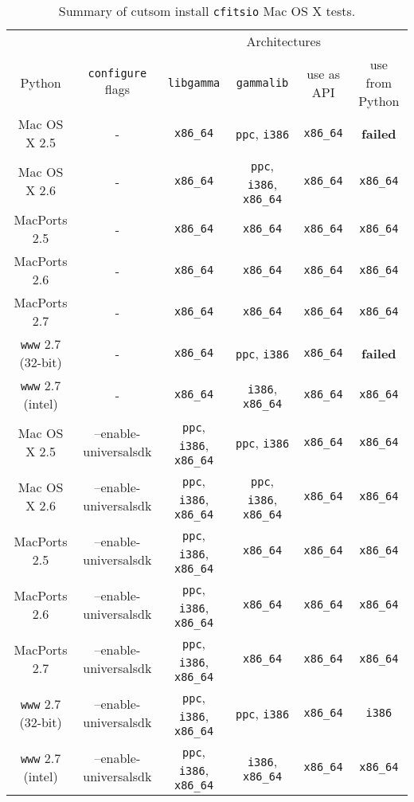 \documentclass{article}[12pt,a4]
\begin{document}
\begin{table}[!h]
  \small
  \center
  \begin{tabular}{cc|cccc}
  \hline
   & & \multicolumn{4}{c}{Architectures} \\
  Python & {\tt configure} flags & {\tt libgamma} & {\tt gammalib} & use as API & use from Python \\
  \hline
  Mac OS X 2.5 & - & {\tt x86\_64} & {\tt ppc}, {\tt i386} & {\tt x86\_64} & {\bf failed} \\
  Mac OS X 2.6 & - & {\tt x86\_64} & {\tt ppc}, {\tt i386}, {\tt x86\_64} & {\tt x86\_64} & {\tt x86\_64} \\
  MacPorts 2.5 & - & {\tt x86\_64} & {\tt x86\_64} & {\tt x86\_64} & {\tt x86\_64} \\
  MacPorts 2.6 & - & {\tt x86\_64} & {\tt x86\_64} & {\tt x86\_64} & {\tt x86\_64} \\
  MacPorts 2.7 & - & {\tt x86\_64} & {\tt x86\_64} & {\tt x86\_64} & {\tt x86\_64} \\
  {\tt www} 2.7 (32-bit) & - & {\tt x86\_64} & {\tt ppc}, {\tt i386} & {\tt x86\_64} &  {\bf failed} \\
  {\tt www} 2.7 (intel) & - & {\tt x86\_64} & {\tt i386}, {\tt x86\_64} & {\tt x86\_64} & {\tt x86\_64} \\
  \hline
  Mac OS X 2.5 & --enable-universalsdk & {\tt ppc}, {\tt i386}, {\tt x86\_64} & {\tt ppc}, {\tt i386} & {\tt x86\_64} & {\tt x86\_64} \\
  Mac OS X 2.6 & --enable-universalsdk & {\tt ppc}, {\tt i386}, {\tt x86\_64} & {\tt ppc}, {\tt i386}, {\tt x86\_64} & {\tt x86\_64} & {\tt x86\_64} \\
  MacPorts 2.5 & --enable-universalsdk & {\tt ppc}, {\tt i386}, {\tt x86\_64} & {\tt x86\_64} & {\tt x86\_64} & {\tt x86\_64} \\
  MacPorts 2.6 & --enable-universalsdk & {\tt ppc}, {\tt i386}, {\tt x86\_64} & {\tt x86\_64} & {\tt x86\_64} & {\tt  x86\_64} \\
  MacPorts 2.7 & --enable-universalsdk & {\tt ppc}, {\tt i386}, {\tt x86\_64} & {\tt x86\_64} & {\tt x86\_64} & {\tt  x86\_64} \\
  {\tt www} 2.7 (32-bit) & --enable-universalsdk & {\tt ppc}, {\tt i386}, {\tt x86\_64} & {\tt ppc}, {\tt i386} & {\tt x86\_64} & {\tt i386} \\
  {\tt www} 2.7 (intel) & --enable-universalsdk & {\tt ppc}, {\tt i386}, {\tt x86\_64} & {\tt i386}, {\tt x86\_64} & {\tt x86\_64} & {\tt x86\_64} \\
\hline
  \end{tabular}
  \caption{Summary of cutsom install {\tt cfitsio} Mac OS X tests.}
  \label{table:custom}
\end{table}
\end{document}
